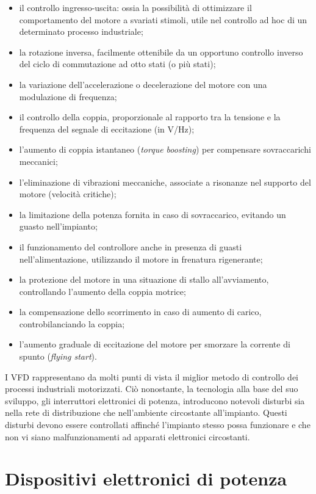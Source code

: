 \begin{itemize}
\item il controllo ingresso-uscita: ossia la possibilità di ottimizzare il comportamento del motore a svariati stimoli, utile nel controllo ad hoc di un determinato processo industriale;
\item la rotazione inversa, facilmente ottenibile da un opportuno controllo inverso del ciclo di commutazione ad otto stati (o più stati);
\item la variazione dell'accelerazione o decelerazione del motore con una modulazione di frequenza;
\item il controllo della coppia, proporzionale al rapporto tra la tensione e la frequenza del segnale di eccitazione (in V/Hz);
\item l'aumento di coppia istantaneo (\textit{torque boosting}) per compensare sovraccarichi meccanici;
\item l'eliminazione di vibrazioni meccaniche, associate a risonanze nel supporto del motore (velocità critiche);
\item la limitazione della potenza fornita in caso di sovraccarico, evitando un guasto nell'impianto;
\item il funzionamento del controllore anche in presenza di guasti nell'alimentazione, utilizzando il motore in frenatura rigenerante;
\item la protezione del motore in una situazione di stallo all'avviamento, controllando l'aumento della coppia motrice;
\item la compensazione dello scorrimento in caso di aumento di carico, controbilanciando la coppia;
\item l'aumento graduale di eccitazione del motore per smorzare la corrente di spunto (\textit{flying start}).
\end{itemize}

I VFD rappresentano da molti punti di vista il miglior metodo di controllo dei processi industriali motorizzati. Ciò nonostante, la tecnologia alla base del suo sviluppo, gli interruttori elettronici di potenza, introducono notevoli disturbi sia nella rete di distribuzione che nell'ambiente circostante all'impianto. Questi disturbi devono essere controllati affinché l'impianto stesso possa funzionare e che non vi siano malfunzionamenti ad apparati elettronici circostanti.

\section{Dispositivi elettronici di potenza}

